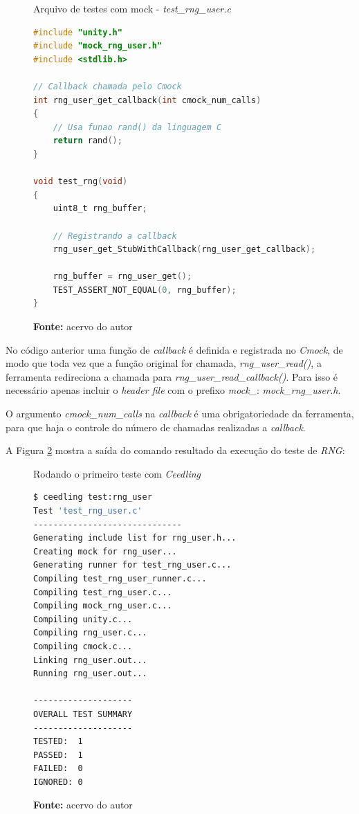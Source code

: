 \documentclass[times, twoside, watermark]{artigo}
\begin{document}
\begin{figure}[H]
  \centering
  \caption{Arquivo de testes com mock - \textit{test\_rng\_user.c}}
\begin{lstlisting}[language=C]
#include "unity.h"
#include "mock_rng_user.h"
#include <stdlib.h>

// Callback chamada pelo Cmock
int rng_user_get_callback(int cmock_num_calls)
{
	// Usa funao rand() da linguagem C
	return rand();
}

void test_rng(void)
{
	uint8_t rng_buffer;

	// Registrando a callback
	rng_user_get_StubWithCallback(rng_user_get_callback);
       
	rng_buffer = rng_user_get();
	TEST_ASSERT_NOT_EQUAL(0, rng_buffer);
}
\end{lstlisting}
  \label{fig:mock-test}
  \caption*{\newline\textbf{Fonte:} acervo do autor}
\end{figure}

No código anterior uma função de \textit{callback} é definida e registrada no
\textit{Cmock}, de modo que toda vez que a função original for chamada,
\textit{rng\_user\_read()}, a ferramenta redireciona a chamada para
\textit{rng\_user\_read\_callback()}. Para isso é necessário apenas incluir
o \textit{header file} com o prefixo \textit{mock\_}: \textit{mock\_rng\_user.h}.

O argumento \textit{cmock\_num\_calls} na \textit{callback} é uma obrigatoriedade
da ferramenta, para que haja o controle do número de chamadas realizadas a
\textit{callback}.

A Figura \ref{fig:ceedling-output} mostra a saída do comando resultado da execução
do teste de \textit{RNG}:\hfill\\

\begin{figure}[H]
  \centering
  \caption{Rodando o primeiro teste com \textit{Ceedling}}
\begin{lstlisting}[language=bash]
$ ceedling test:rng_user
Test 'test_rng_user.c'
------------------------------
Generating include list for rng_user.h...
Creating mock for rng_user...
Generating runner for test_rng_user.c...
Compiling test_rng_user_runner.c...
Compiling test_rng_user.c...
Compiling mock_rng_user.c...
Compiling unity.c...
Compiling rng_user.c...
Compiling cmock.c...
Linking rng_user.out...
Running rng_user.out...

--------------------
OVERALL TEST SUMMARY
--------------------
TESTED:  1
PASSED:  1
FAILED:  0
IGNORED: 0
\end{lstlisting}
  \label{fig:ceedling-output}
  \caption*{\newline\textbf{Fonte:} acervo do autor}
\end{figure}
\end{document}
